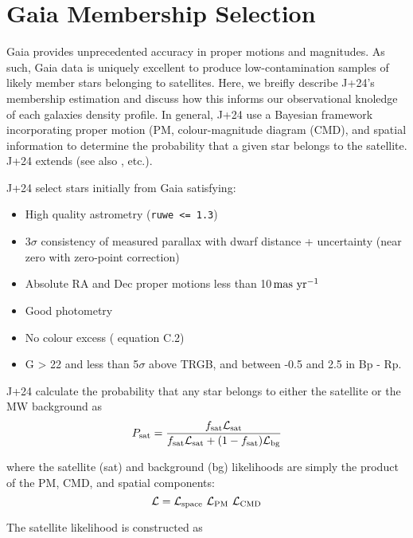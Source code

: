\section{Gaia Membership Selection}\label{gaia-membership-selection}

Gaia provides unprecedented accuracy in proper motions and magnitudes.
As such, Gaia data is uniquely excellent to produce low-contamination
samples of likely member stars belonging to satellites. Here, we breifly
describe J+24's membership estimation and discuss how this informs our
observational knoledge of each galaxies density profile. In general,
J+24 use a Bayesian framework incorporating proper motion (PM,
colour-magnitude diagram (CMD), and spatial information to determine the
probability that a given star belongs to the satellite. J+24 extends
\citet{MV2020a} (see also \citet{pace+li2019}, etc.).

J+24 select stars initially from Gaia satisfying:

\begin{itemize}
\tightlist
\item
  High quality astrometry (\texttt{ruwe\ \textless{}=\ 1.3})
\item
  3\(\sigma\) consistency of measured parallax with dwarf distance +
  uncertainty (near zero with \citet{lindegren+2018} zero-point
  correction)
\item
  Absolute RA and Dec proper motions less than
  10\(\,{\rm mas\ yr^{-1}}\)
\item
  Good photometry
\item
  No colour excess (\citet{lindegren+2018} equation C.2)
\item
  G \textgreater{} 22 and less than 5\(\sigma\) above TRGB, and between
  -0.5 and 2.5 in Bp - Rp.
\end{itemize}

J+24 calculate the probability that any star belongs to either the
satellite or the MW background as \[
P_{\rm sat} = \frac{f_{\rm sat}{\cal L}_{\rm sat}}{f_{\rm sat}{\cal L}_{\rm sat} + (1-f_{\rm sat}){\cal L}_{\rm bg}}
\]

where the satellite (sat) and background (bg) likelihoods are simply the
product of the PM, CMD, and spatial components: \[
{\cal L} = {\cal L}_{\rm space}\ {\cal L}_{\rm PM}\ {\cal L}_{\rm CMD}
\]

The satellite likelihood is constructed as

